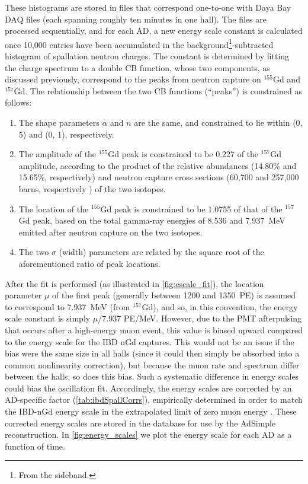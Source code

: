 \documentclass[../thesis.tex]{subfiles}
\begin{document}
\begin{comment}
  Note: For AdSimpleNL, in reconstruction, a (AD-specific?) scale constant is applied to the non-NL energy scale constant. See line 209 of QsumEnergyTool.cc. Discuss this?
\end{comment}

These histograms are stored in files that correspond one-to-one with Daya Bay DAQ files (each spanning roughly ten minutes in one hall). The files are processed sequentially, and for each AD, a new energy scale constant is calculated once 10,000 entries have been accumulated in the background\footnote{From the sideband.}-subtracted histogram of spallation neutron charges. The constant is determined by fitting the charge spectrum to a double CB function, whose two components, as discussed previously, correspond to the peaks from neutron capture on $^{155}$Gd and $^{157}$Gd. The relationship between the two CB functions (``peaks'') is constrained as follows:

\begin{enumerate}
\item The shape parameters $\alpha$ and $n$ are the same, and constrained to lie within (0, 5) and (0, 1), respectively.
\item The amplitude of the $^{155}$Gd peak is constrained to be 0.227 of the $^{157}$Gd amplitude, according to the product of the relative abundances (14.80\% and 15.65\%, respectively) and neutron capture cross sections (60,700 and 257,000 barns, respectively \cite{doi:10.13182/NSE05-64}) of the two isotopes.
\item The location of the $^{155}$Gd peak is constrained to be 1.0755 of that of the $^{157}$Gd peak, based on the total gamma-ray energies of 8.536 and 7.937~MeV emitted after neutron capture on the two isotopes.
\item The two $\sigma$ (width) parameters are related by the square root of the aforementioned ratio of peak locations.
\end{enumerate}

After the fit is performed (as illustrated in \autoref{fig:escale_fit}), the location parameter $\mu$ of the first peak (generally between 1200 and 1350~PE) is assumed to correspond to 7.937~MeV (from $^{157}$Gd), and so, in this convention, the energy scale constant is simply $\mu/7.937$ PE/MeV. However, due to the PMT afterpulsing that occurs after a high-energy muon event, this value is biased upward compared to the energy scale for the IBD nGd captures. This would not be an issue if the bias were the same size in all halls (since it could then simply be absorbed into a common nonlinearity correction), but because the muon rate and spectrum differ between the halls, so does this bias. Such a systematic difference in energy scales could bias the oscillation fit. Accordingly, the energy scales are corrected by an AD-specific factor (\autoref{tab:ibdSpallCorrs}), empirically determined in order to match the IBD-nGd energy scale in the extrapolated limit of zero muon energy \cite{spallScaleCorr}. These corrected energy scales are stored in the database for use by the AdSimple reconstruction. In \autoref{fig:energy_scales} we plot the energy scale for each AD as a function of time.
\end{document}
